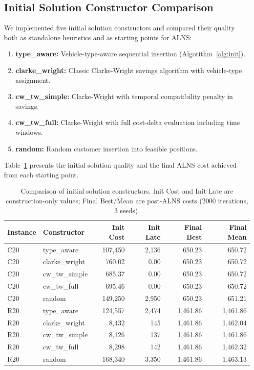 \documentclass[11pt]{article}
\begin{document}
\subsection{Initial Solution Constructor Comparison}

We implemented five initial solution constructors and compared their quality both as standalone heuristics and as starting points for ALNS:

\begin{enumerate}[leftmargin=*]
    \item \textbf{type\_aware:} Vehicle-type-aware sequential insertion (Algorithm~\ref{alg:init}).
    \item \textbf{clarke\_wright:} Classic Clarke-Wright savings algorithm with vehicle-type assignment.
    \item \textbf{cw\_tw\_simple:} Clarke-Wright with temporal compatibility penalty in savings.
    \item \textbf{cw\_tw\_full:} Clarke-Wright with full cost-delta evaluation including time windows.
    \item \textbf{random:} Random customer insertion into feasible positions.
\end{enumerate}

Table~\ref{tab:initials} presents the initial solution quality and the final ALNS cost achieved from each starting point.

\begin{table}[h]
\centering
\begin{tabular}{@{}llrrrr@{}}
\toprule
\textbf{Instance} & \textbf{Constructor} & \textbf{Init Cost} & \textbf{Init Late} & \textbf{Final Best} & \textbf{Final Mean} \\
\midrule
C20 & type\_aware & 107,450 & 2,136 & 650.23 & 650.72 \\
C20 & clarke\_wright & 760.02 & 0.00 & 650.23 & 650.72 \\
C20 & cw\_tw\_simple & 685.37 & 0.00 & 650.23 & 650.72 \\
C20 & cw\_tw\_full & 695.46 & 0.00 & 650.23 & 650.72 \\
C20 & random & 149,250 & 2,950 & 650.23 & 651.21 \\
\midrule
R20 & type\_aware & 124,557 & 2,474 & 1,461.86 & 1,461.86 \\
R20 & clarke\_wright & 8,432 & 145 & 1,461.86 & 1,462.04 \\
R20 & cw\_tw\_simple & 8,126 & 137 & 1,461.86 & 1,461.86 \\
R20 & cw\_tw\_full & 8,298 & 142 & 1,461.86 & 1,462.32 \\
R20 & random & 168,340 & 3,350 & 1,461.86 & 1,463.13 \\
\bottomrule
\end{tabular}
\caption{Comparison of initial solution constructors. Init Cost and Init Late are construction-only values; Final Best/Mean are post-ALNS costs (2000 iterations, 3 seeds).}
\label{tab:initials}
\end{table}
\end{document}
